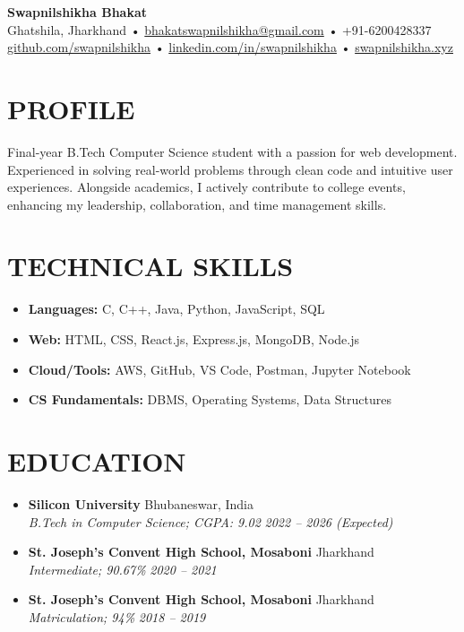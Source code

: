 \documentclass[a4paper,10pt]{article}
\newcommand{\resheading}[1]{\vspace{-5pt}\section*{\uppercase{#1}}\vspace{-6pt}}
\newcommand{\ressubheading}[4]{
  \textbf{#1} \hfill #2 \\
  \textit{#3} \hfill \textit{#4}
}
\begin{document}
\vspace{10pt}
\begin{center}
    {\LARGE \textbf{Swapnilshikha Bhakat}} \\
    \vspace{1pt}
    Ghatshila, Jharkhand • \href{mailto:bhakatswapnilshikha@gmail.com}{bhakatswapnilshikha@gmail.com} • +91-6200428337 \\
    \href{https://github.com/swapnilshikha}{github.com/swapnilshikha} • 
    \href{https://linkedin.com/in/swapnilshikha-bhakat-264221270}{linkedin.com/in/swapnilshikha} • 
    \href{https://swapnilshikha.xyz/}{swapnilshikha.xyz}
\end{center}

\resheading{Profile}
\noindent
Final-year B.Tech Computer Science student with a passion for web development. Experienced in solving real-world problems through clean code and intuitive user experiences. Alongside academics, I actively contribute to college events, enhancing my leadership, collaboration, and time management skills.

\resheading{Technical Skills}
\begin{itemize}[leftmargin=0.2in, itemsep=2pt, topsep=1pt]
  \item \textbf{Languages:} C, C++, Java, Python, JavaScript, SQL
  \item \textbf{Web:} HTML, CSS, React.js, Express.js, MongoDB, Node.js
  \item \textbf{Cloud/Tools:} AWS, GitHub, VS Code, Postman, Jupyter Notebook
  \item \textbf{CS Fundamentals:} DBMS, Operating Systems, Data Structures
\end{itemize}

\resheading{Education}
\begin{itemize}[leftmargin=0.15in, itemsep=4pt, topsep=1pt]
  \item \ressubheading{Silicon University}{Bhubaneswar, India}{B.Tech in Computer Science; CGPA: 9.02}{2022 – 2026 (Expected)}
  \item \ressubheading{St. Joseph’s Convent High School, Mosaboni}{Jharkhand}{Intermediate; 90.67\%}{2020 – 2021}
  \item \ressubheading{St. Joseph’s Convent High School, Mosaboni}{Jharkhand}{Matriculation; 94\%}{2018 – 2019}
\end{itemize}
\end{document}
